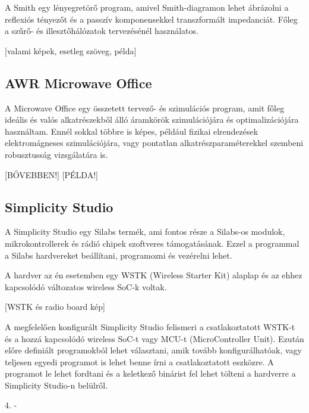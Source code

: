 \documentclass[a4paper,12pt,titlepage]{article}
\begin{document}
A Smith egy lényegretörő program, amivel Smith-diagramon lehet ábrázolni a reflexiós tényezőt és a passzív komponensekkel transzformált impedanciát. Főleg a szűrő- és illesztőhálózatok tervezésénél használatos.

[valami képek, esetleg szöveg, példa]

\subsection{AWR Microwave Office}

A Microwave Office egy összetett tervező- és szimulációs program, amit főleg ideális és valós alkatrészekből álló áramkörök szimulációjára és optimalizációjára használtam. Ennél sokkal többre is képes, például fizikai elrendezések elektromágneses szimulációjára, vagy pontatlan alkatrészparaméterekkel szembeni robusztusság vizsgálatára is.

[BŐVEBBEN!]
[PÉLDA!]

\subsection{Simplicity Studio}

A Simplicity Studio egy Silabs termék, ami fontos része a Silabs-os modulok, mikrokontrollerek és rádió chipek szoftveres támogatásának. Ezzel a programmal a Silabs hardvereket beállítani, programozni és vezérelni lehet.

A hardver az én esetemben egy WSTK (Wireless Starter Kit) alaplap és az ehhez kapcsolódó változatos wireless SoC-k voltak.

[WSTK és radio board kép]

A megfelelően konfigurált Simplicity Studio felismeri a csatlakoztatott WSTK-t és a hozzá kapcsolódó wireless SoC-t vagy MCU-t (MicroController Unit). Ezután előre definiált programokból lehet választani, amik tovább konfigurálhatóak, vagy teljesen egyedi programot is lehet benne írni a csatlakoztatott eszközre. A programot le lehet fordtani és a keletkező binárist fel lehet tölteni a hardverre a Simplicity Studio-n belülről.


4. -


	\newpage	
	
\end{document}
